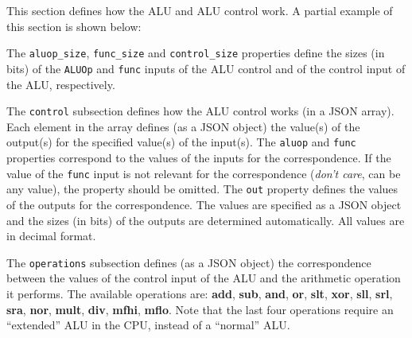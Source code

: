 \documentclass[11pt,a4paper,twoside,titlepage]{report}
\begin{document}
This section defines how the ALU and ALU control work.
A partial example of this section is shown below:



The \verb+aluop_size+, \verb+func_size+ and \verb+control_size+ properties
define the sizes (in bits) of the \verb+ALUOp+ and \verb+func+ inputs of the
ALU control and of the control input of the ALU, respectively.

The \verb+control+ subsection defines how the ALU control works (in a JSON array).
Each element in the array defines (as a JSON object) the value(s) of the output(s)
for the specified value(s) of the input(s).
The \verb+aluop+ and \verb+func+ properties correspond to the values of the
inputs for the correspondence. If the value of the \verb+func+ input is not relevant
for the correspondence (\emph{don't care}, can be any value), the property 
should be omitted.
The \verb+out+ property defines the values of the outputs for the correspondence.
The values are specified as a JSON object and the sizes (in bits) of the outputs
are determined automatically.
All values are in decimal format.

The \verb+operations+ subsection defines (as a JSON object) the correspondence 
between the values of the control input of the ALU and the arithmetic operation 
it performs.
The available operations are: \textbf{add}, \textbf{sub}, \textbf{and}, \textbf{or},
\textbf{slt}, \textbf{xor}, \textbf{sll}, \textbf{srl}, \textbf{sra}, \textbf{nor},
\textbf{mult}, \textbf{div}, \textbf{mfhi}, \textbf{mflo}.
Note that the last four operations require an ``extended'' ALU in the CPU, instead 
of a ``normal'' ALU.
\end{document}

